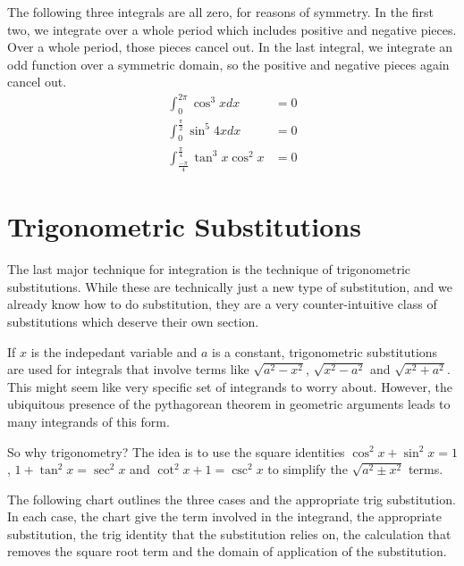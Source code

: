 \documentclass[fleqn]{report}
\begin{document}
\begin{example}
The following three integrals are all zero, for reasons of
symmetry. In the first two, we integrate over a whole period
which includes positive and negative pieces. Over a whole
period, those pieces cancel out. In the last integral, we
integrate an odd function over a symmetric domain, so the
positive and negative pieces again cancel out.
\begin{align*}
\int_0^{2\pi} \cos^3 x dx & = 0 \\
\int_0^{\frac{\pi}{2}} \sin^5 4x dx & = 0 \\
\int_{\frac{-\pi}{4}}^{\frac{\pi}{4}} \tan^3 x \cos^2 x & = 0
\end{align*}
\end{example}

\section{Trigonometric Substitutions}
\label{trig-substitutions}

The last major technique for integration is the technique of
trigonometric substitutions. While these are technically just
a new type of substitution, and we already know how to do
substitution, they are a very counter-intuitive class of
substitutions which deserve their own section.

If $x$ is the indepedant variable and $a$ is a constant,
trigonometric substitutions are used for integrals that
involve terms like $\sqrt{a^2 - x^2}$, $\sqrt{x^2 - a^2}$ and
$\sqrt{x^2 + a^2}$. This might seem like very specific set of
integrands to worry about. However, the ubiquitous presence of
the pythagorean theorem in geometric arguments leads to many
integrands of this form. 

So why trigonometry? The idea is to use the square identities 
$\cos^2 x + \sin^2 x = 1$, $1 + \tan^2 x = \sec^2 x$ and
$\cot^2 x + 1 = \csc^2 x$ to simplify the $\sqrt{a^2 \pm x^2}$ terms. 

The following chart outlines the three cases and the
appropriate trig substitution. In each case, the chart give
the term involved in the integrand, the appropriate
substitution, the trig identity that the substitution relies
on, the calculation that removes the square root term and the
domain of application of the substitution.
\end{document}
